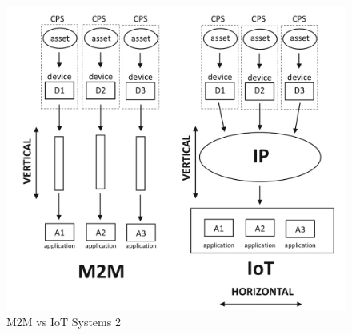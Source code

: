 \documentclass[conference]{IEEEtran}
\begin{document}
\begin{figure}
\centerline{\includegraphics[width=\linewidth]{Pictures/M2M to IoT 2.png}}
\caption{M2M vs IoT Systems 2}
\label{fig:M2M_vs_IoT2}
\end{figure}
\end{document}
